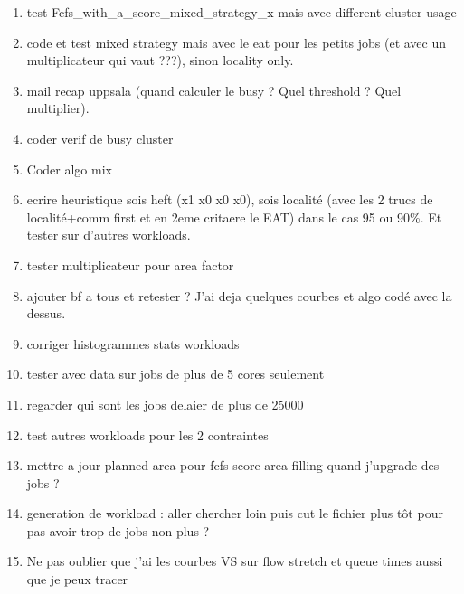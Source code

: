 \documentclass[a4paper]{article}
\begin{document}
\begin{enumerate}
			\item test Fcfs\_with\_a\_score\_mixed\_strategy\_x mais avec different cluster usage
			\item code et test mixed strategy mais avec le eat pour les petits jobs (et avec un multiplicateur qui vaut ???), sinon locality only.
			\item mail recap uppsala (quand calculer le busy ? Quel threshold ? Quel multiplier).
			\item coder verif de busy cluster
			\item Coder algo mix
			\item ecrire heuristique sois heft (x1 x0 x0 x0), sois localité (avec les 2 trucs de localité+comm first et en 2eme critaere le EAT) dans le cas 95 ou 90\%. Et tester sur d'autres workloads.
			\item tester multiplicateur pour area factor
			\item ajouter bf a tous et retester ? J'ai deja quelques courbes et algo codé avec la dessus.
			\item corriger histogrammes stats workloads
			\item tester avec data sur jobs de plus de 5 cores seulement
			\item regarder qui sont les jobs delaier de plus de 25000
			\item test autres workloads pour les 2 contraintes
			\item mettre a jour planned area pour fcfs score area filling quand j'upgrade des jobs ?
			\item generation de workload : aller chercher loin puis cut le fichier plus tôt pour pas avoir trop de jobs non plus ?
			\item Ne pas oublier que j'ai les courbes VS sur flow stretch et queue times aussi que je peux tracer						
		\end{enumerate}
\end{document}
